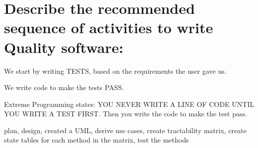 \section{Describe the recommended sequence of activities to write Quality software:}

We start by writing TESTS, based on the requirements the user gave us.

We write code to make the tests PASS.

Extreme Programming states: YOU NEVER WRITE A LINE OF CODE UNTIL YOU WRITE A TEST FIRST. Then you write the code to make the test pass.

plan, design, created a UML, derive use cases, create tractability matrix, create state tables for each method in the matrix, test the methods

